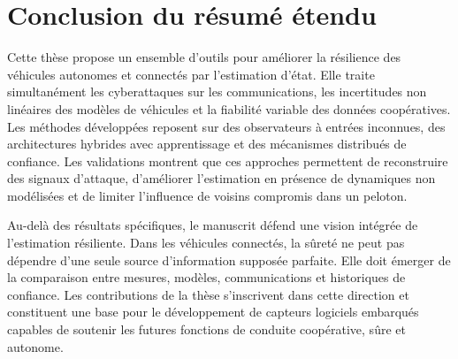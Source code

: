 \section*{Conclusion du résumé étendu}

Cette thèse propose un ensemble d'outils pour améliorer la résilience des véhicules autonomes et connectés par l'estimation d'état. Elle traite simultanément les cyberattaques sur les communications, les incertitudes non linéaires des modèles de véhicules et la fiabilité variable des données coopératives. Les méthodes développées reposent sur des observateurs à entrées inconnues, des architectures hybrides avec apprentissage et des mécanismes distribués de confiance. Les validations montrent que ces approches permettent de reconstruire des signaux d'attaque, d'améliorer l'estimation en présence de dynamiques non modélisées et de limiter l'influence de voisins compromis dans un peloton.

Au-delà des résultats spécifiques, le manuscrit défend une vision intégrée de l'estimation résiliente. Dans les véhicules connectés, la sûreté ne peut pas dépendre d'une seule source d'information supposée parfaite. Elle doit émerger de la comparaison entre mesures, modèles, communications et historiques de confiance. Les contributions de la thèse s'inscrivent dans cette direction et constituent une base pour le développement de capteurs logiciels embarqués capables de soutenir les futures fonctions de conduite coopérative, sûre et autonome.
